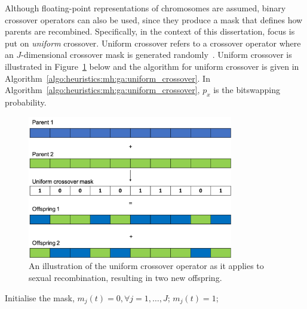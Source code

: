 Although floating-point representations of chromosomes are assumed, binary crossover operators can also be used, since they produce a mask that defines how parents are recombined. Specifically, in the context of this dissertation, focus is put on \textit{uniform} crossover. Uniform crossover refers to a crossover operator where an $J$-dimensional crossover mask is generated randomly~\cite{ref:syswerda:1989}. Uniform crossover is illustrated in Figure~\ref{fig:heuristics:mh:ga:uniform_crossover} below and the algorithm for uniform crossover is given in Algorithm~\ref{algo:heuristics:mh:ga:uniform_crossover}. In Algorithm~\ref{algo:heuristics:mh:ga:uniform_crossover}, $p_{x}$ is the bitswapping probability.


\begin{figure}[htbp]
      \centering
      \includegraphics[width=0.8\textwidth]{images/uniform_crossover.pdf}
      \caption{An illustration of the uniform crossover operator as it applies to sexual recombination, resulting in two new offspring.}
      \label{fig:heuristics:mh:ga:uniform_crossover}
\end{figure}


\begin{algorithm}[H]
      \caption{The pseudo code for the uniform crossover operator as used by \acp{GA}.}
      \label{algo:heuristics:mh:ga:uniform_crossover}
      \begin{algorithmic}
            \State Initialise the mask, $m_{j}(t) = 0, \forall j = 1, \dots, J$;
            \State $m_{j}(t) = 1$;
            \EndIf
            \EndFor
            \State
      \end{algorithmic}
\end{algorithm}


